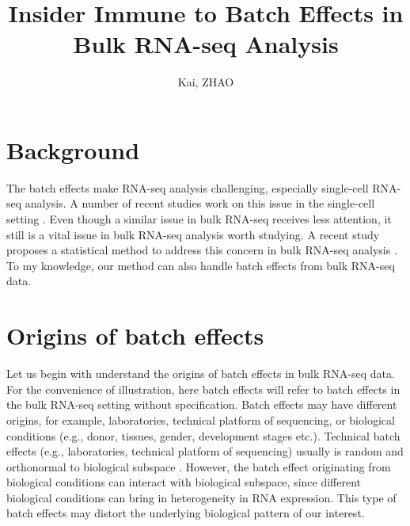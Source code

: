 \documentclass[10]{article}
\begin{document}
\title{Insider Immune to Batch Effects in Bulk RNA-seq Analysis}
\author{Kai, ZHAO}
\maketitle

\section{Background}
  The batch effects make RNA-seq analysis challenging, especially single-cell RNA-seq analysis. A number of recent studies work on this issue in the single-cell setting \cite{butler2018integrating,welch2019single,haghverdi2018batch}. Even though a similar issue in bulk RNA-seq receives less attention, it still is a vital issue in bulk RNA-seq analysis worth studying. A recent study proposes a statistical method to address this concern in bulk RNA-seq analysis \cite{molania2022removing}. To my knowledge, our method can also handle batch effects from bulk RNA-seq data.  

\section{Origins of batch effects}
  Let us begin with understand the origins of batch effects in bulk RNA-seq data. For the convenience of illustration, here batch effects will refer to batch effects in the bulk RNA-seq setting without specification. Batch effects may have different origins, for example, laboratories, technical platform of sequencing, or biological conditions (e.g., donor, tissues, gender, development stages etc.). Technical batch effects (e.g., laboratories, technical platform of sequencing) usually is random and orthonormal to biological subspace \cite{haghverdi2018batch}. However, the batch effect originating from biological conditions can interact with biological subspace, since different biological conditions can bring in heterogeneity in RNA expression. This type of batch effects may distort the underlying biological pattern of our interest.
\end{document}
